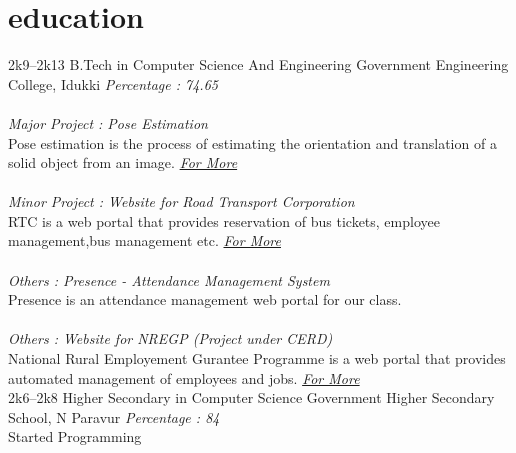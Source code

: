 \documentclass[]{friggeri-cv} %
\begin{document}

\section{education}

\begin{entrylist}
\entry
{2k9--2k13}
{B.Tech {\normalfont in Computer Science And Engineering}}
{Government Engineering College, Idukki}
{\emph{Percentage : 74.65} \\ \\
\emph{Major Project : Pose Estimation} \\ Pose estimation is the process of estimating the orientation and translation of a solid object from an image.
\href{https://dl.dropboxusercontent.com/u/93201119/rakesh/b.tech/MajorProject/reportRakesh.pdf}{\emph{For More}} \\ \\
\emph{Minor Project : Website for Road Transport Corporation } \\ RTC is a web portal that provides reservation of bus tickets, employee management,bus management etc.
\href{http://www.rtcgeci.host22.com/index.php}{\emph{For More}} \\ \\
\emph{Others : Presence - Attendance Management System } \\ Presence is an attendance management web portal for our class.\\ \\
\emph{Others : Website for NREGP (Project under CERD) } \\ National Rural Employement Gurantee Programme is a web portal that provides automated management of employees and jobs.
\href{http://www.cerd.cet.ac.in/downloads/27-07-2012/sanctioned\%20proposal\%20for\%20students\%20project\%20-2012.pdf}{\emph{For More}}}
\\
\entry
{2k6--2k8}
{Higher Secondary {\normalfont in Computer Science}}
{Government Higher Secondary School, N Paravur}
{\emph{Percentage : 84} \\ Started Programming}
\end{entrylist}
\end{document}
